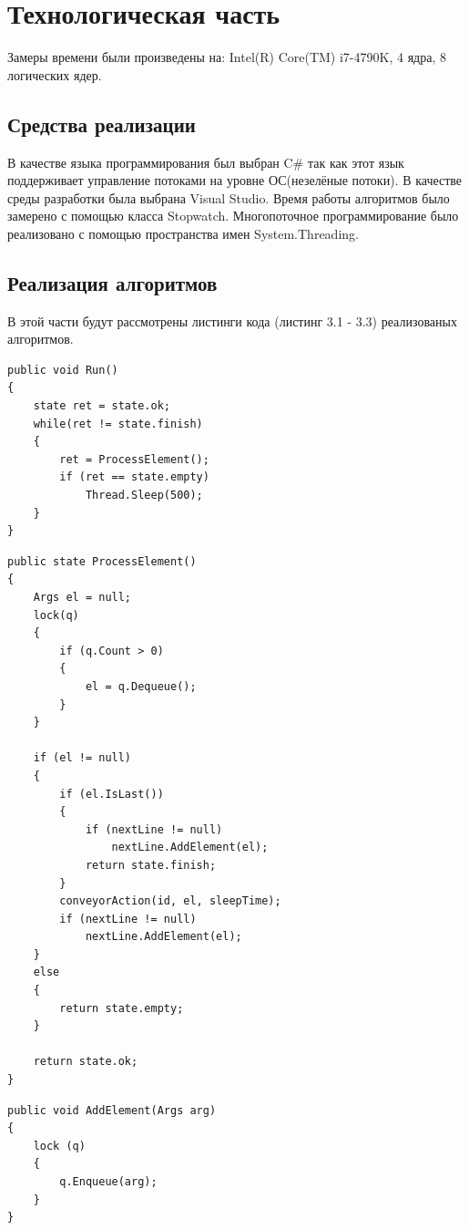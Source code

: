 \documentclass[12pt]{report}
\begin{document}
\newpage
\chapter{Технологическая часть}
Замеры времени были произведены на: Intel(R) Core(TM) i7-4790K, 4 ядра, 8 логических ядер.


\section{Средства реализации}
В качестве языка программирования был выбран C\# \cite{Microsoft} так как этот
язык поддерживает управление потоками на уровне ОС(незелёные потоки). В качестве среды разработки была выбрана Visual Studio. 
Время работы алгоритмов было замерено с помощью класса Stopwatch. Многопоточное программирование было
реализовано с помощью пространства имен System.Threading.


\section{Реализация алгоритмов}
В этой части будут рассмотрены листинги кода (листинг 3.1 - 3.3) реализованых алгоритмов.

\captionsetup{singlelinecheck = false, justification=raggedright}
\begin{lstlisting}[label=some-code,caption=Функция для запуска в потоке]
public void Run()
{
    state ret = state.ok;
    while(ret != state.finish)
    {
        ret = ProcessElement();
        if (ret == state.empty)
            Thread.Sleep(500);
    }
}
\end{lstlisting}

\newpage
\begin{lstlisting}[label=some-code,caption=Обработка элемента]
public state ProcessElement()
{
    Args el = null;
    lock(q)
    {
        if (q.Count > 0)
        {
            el = q.Dequeue();
        }
    }
    
    if (el != null)
    {
        if (el.IsLast())
        {
            if (nextLine != null)
                nextLine.AddElement(el);
            return state.finish;
        }
        conveyorAction(id, el, sleepTime);
        if (nextLine != null)
            nextLine.AddElement(el);
    }
    else
    {
        return state.empty;
    }

    return state.ok;
}
\end{lstlisting}


\begin{lstlisting}[label=some-code,caption=Добавление элемента в очередь]
public void AddElement(Args arg)
{
    lock (q)
    {
        q.Enqueue(arg);
    }
}
\end{lstlisting}
\captionsetup{singlelinecheck = false, justification=centering}
\end{document}
